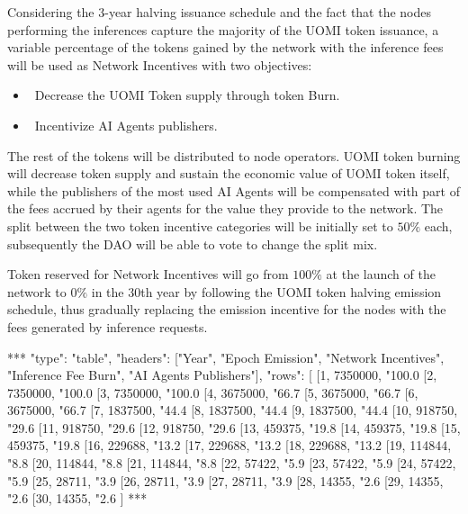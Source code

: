 \documentclass{article}
\begin{document}
Considering the 3-year halving issuance schedule and the fact that the nodes performing the inferences capture the majority of the UOMI token issuance, a variable percentage of the tokens gained by the network with the inference fees will be used as Network Incentives with two objectives: 
\begin{itemize}
\item \ Decrease the UOMI Token supply through token Burn.
\item \ Incentivize AI Agents publishers.
\end{itemize}

The rest of the tokens will be distributed to node operators. UOMI token burning will decrease token supply and sustain the economic value of UOMI token itself, while the publishers of the most used AI Agents will be compensated with part of the fees accrued by their agents for the value they provide to the network. The split between the two token incentive categories will be initially set to \( 50\%\) each, subsequently the DAO will be able to vote to change the split mix.

Token reserved for Network Incentives will go from \( 100\%\) at the launch of the network to \( 0\%\) in the 30th year by following the UOMI token halving emission schedule, thus gradually replacing the emission incentive for the nodes with the fees generated by inference requests. 

\begin{center}
***
"type": "table",
"headers": ["Year", "Epoch Emission", "Network Incentives", "Inference Fee Burn", "AI Agents Publishers"],
"rows": [
  [1, 7350000, "100.0%
  [2, 7350000, "100.0%
  [3, 7350000, "100.0%
  [4, 3675000, "66.7%
  [5, 3675000, "66.7%
  [6, 3675000, "66.7%
  [7, 1837500, "44.4%
  [8, 1837500, "44.4%
  [9, 1837500, "44.4%
  [10, 918750, "29.6%
  [11, 918750, "29.6%
  [12, 918750, "29.6%
  [13, 459375, "19.8%
  [14, 459375, "19.8%
  [15, 459375, "19.8%
  [16, 229688, "13.2%
  [17, 229688, "13.2%
  [18, 229688, "13.2%
  [19, 114844, "8.8%
  [20, 114844, "8.8%
  [21, 114844, "8.8%
  [22, 57422, "5.9%
  [23, 57422, "5.9%
  [24, 57422, "5.9%
  [25, 28711, "3.9%
  [26, 28711, "3.9%
  [27, 28711, "3.9%
  [28, 14355, "2.6%
  [29, 14355, "2.6%
  [30, 14355, "2.6%
]
***
\end{center}
\end{document}
